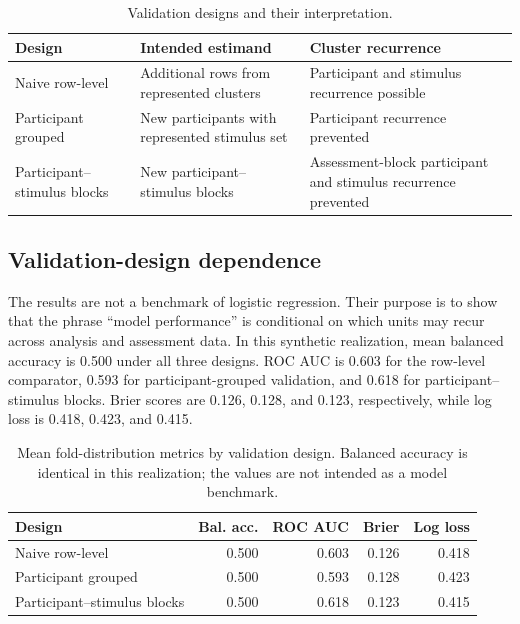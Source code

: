 \documentclass[article]{jss}
\begin{document}
\begin{table}[t]
\centering
\caption{\label{tab:validation-designs}Validation designs and their interpretation.}
\small
\begin{tabularx}{\textwidth}{@{}p{}YY@{}}
\toprule
Design & Intended estimand & Cluster recurrence\\
\midrule
Naive row-level & Additional rows from represented clusters &
Participant and stimulus recurrence possible\\
Participant grouped & New participants with represented stimulus set &
Participant recurrence prevented\\
Participant--stimulus blocks & New participant--stimulus blocks &
Assessment-block participant and stimulus recurrence prevented\\
\bottomrule
\end{tabularx}
\end{table}

\subsection{Validation-design dependence}

The results are not a benchmark of logistic regression. Their purpose is to show that
the phrase ``model performance'' is conditional on which units may recur across
analysis and assessment data. In this synthetic realization, mean balanced accuracy is
0.500 under all three designs. ROC AUC is 0.603 for the row-level comparator, 0.593 for
participant-grouped validation, and 0.618 for participant--stimulus blocks. Brier scores
are 0.126, 0.128, and 0.123, respectively, while log loss is 0.418, 0.423, and 0.415.

\begin{table}[t]
\centering
\caption{\label{tab:performance}Mean fold-distribution metrics by validation design.
Balanced accuracy is identical in this realization; the values are not intended as a
model benchmark.}
\small
\begin{tabular}{@{}lrrrr@{}}
\toprule
Design & Bal. acc. & ROC AUC & Brier & Log loss\\
\midrule
Naive row-level & 0.500 & 0.603 & 0.126 & 0.418\\
Participant grouped & 0.500 & 0.593 & 0.128 & 0.423\\
Participant--stimulus blocks & 0.500 & 0.618 & 0.123 & 0.415\\
\bottomrule
\end{tabular}
\end{table}
\end{document}
